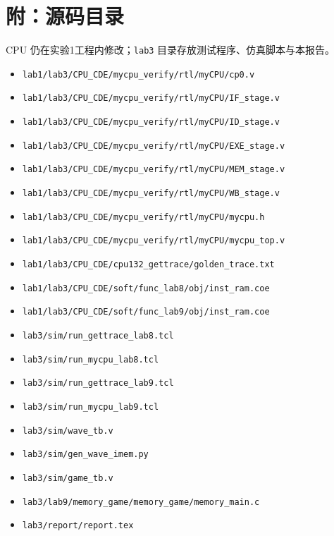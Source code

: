 \documentclass{article}
\begin{document}
\section{附：源码目录}
CPU 仍在实验1工程内修改；\texttt{lab3} 目录存放测试程序、仿真脚本与本报告。
\begin{itemize}
\item \verb|lab1/lab3/CPU_CDE/mycpu_verify/rtl/myCPU/cp0.v|
\item \verb|lab1/lab3/CPU_CDE/mycpu_verify/rtl/myCPU/IF_stage.v|
\item \verb|lab1/lab3/CPU_CDE/mycpu_verify/rtl/myCPU/ID_stage.v|
\item \verb|lab1/lab3/CPU_CDE/mycpu_verify/rtl/myCPU/EXE_stage.v|
\item \verb|lab1/lab3/CPU_CDE/mycpu_verify/rtl/myCPU/MEM_stage.v|
\item \verb|lab1/lab3/CPU_CDE/mycpu_verify/rtl/myCPU/WB_stage.v|
\item \verb|lab1/lab3/CPU_CDE/mycpu_verify/rtl/myCPU/mycpu.h|
\item \verb|lab1/lab3/CPU_CDE/mycpu_verify/rtl/myCPU/mycpu_top.v|
\item \verb|lab1/lab3/CPU_CDE/cpu132_gettrace/golden_trace.txt|
\item \verb|lab1/lab3/CPU_CDE/soft/func_lab8/obj/inst_ram.coe|
\item \verb|lab1/lab3/CPU_CDE/soft/func_lab9/obj/inst_ram.coe|
\item \verb|lab3/sim/run_gettrace_lab8.tcl|
\item \verb|lab3/sim/run_mycpu_lab8.tcl|
\item \verb|lab3/sim/run_gettrace_lab9.tcl|
\item \verb|lab3/sim/run_mycpu_lab9.tcl|
\item \verb|lab3/sim/wave_tb.v|
\item \verb|lab3/sim/gen_wave_imem.py|
\item \verb|lab3/sim/game_tb.v|
\item \verb|lab3/lab9/memory_game/memory_game/memory_main.c|
\item \verb|lab3/report/report.tex|
\end{itemize}
\end{document}
